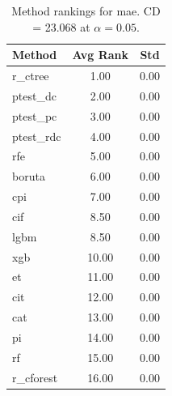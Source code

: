 \begin{table}[h]
\centering
\caption{Method rankings for mae. CD = 23.068 at $\alpha=0.05$.}
\label{tab:ranks_mae}
\begin{tabular}{lcc}
\toprule
Method & Avg Rank & Std \\
\midrule
r_ctree & 1.00 & 0.00 \\
ptest_dc & 2.00 & 0.00 \\
ptest_pc & 3.00 & 0.00 \\
ptest_rdc & 4.00 & 0.00 \\
rfe & 5.00 & 0.00 \\
boruta & 6.00 & 0.00 \\
cpi & 7.00 & 0.00 \\
cif & 8.50 & 0.00 \\
lgbm & 8.50 & 0.00 \\
xgb & 10.00 & 0.00 \\
et & 11.00 & 0.00 \\
cit & 12.00 & 0.00 \\
cat & 13.00 & 0.00 \\
pi & 14.00 & 0.00 \\
rf & 15.00 & 0.00 \\
r_cforest & 16.00 & 0.00 \\
\bottomrule
\end{tabular}
\end{table}